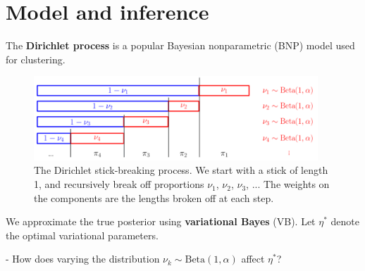 \documentclass[a0,plainsections,30pt]{sciposter}\usepackage[]{graphicx}\usepackage[]{color}
\begin{document}
\begin{minipage}[t]{0.45\textwidth}
\section*{Model and inference }
\vspace{-0.3in}

The \textbf{Dirichlet process} is a popular Bayesian nonparametric
(BNP) model used for clustering.

\begin{figure}[!h]
\centering
\includegraphics[width = 0.95\textwidth]{./images/DP_stick_breaking.png}
\caption{The Dirichlet stick-breaking process. We start with a stick of
length 1, and recursively break off proportions $\nu_1$, $\nu_2$, $\nu_3$, ...
The weights on the components are the lengths broken off at each step.}
\setlength{\textfloatsep}{-10pt}
\end{figure}

%
%

We approximate the true posterior using \textbf{variational Bayes} (VB). Let $\eta^*$ denote the optimal variational parameters.
%
%
%
%
%

\begin{mdframed}[style=MyFrame]
- How does varying the distribution $\nu_k \sim \text{Beta}(1, \alpha)$ affect $\eta^*$?


\end{mdframed}
\end{minipage}
\end{document}
